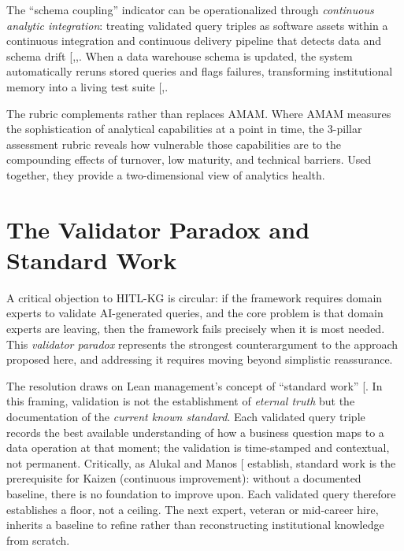 \documentclass[
  american,
  11pt,
  letterpaper,
  oneside  ,captions=tableheading
]{scrartcl}
\begin{document}
The ``schema coupling'' indicator can be operationalized through
\emph{continuous analytic integration}: treating validated query triples
as software assets within a continuous integration and continuous
delivery pipeline that detects data and schema drift
{[},,\citeproc{ref-mannapur2025}{68}{]}.
When a data warehouse schema is updated, the system automatically reruns
stored queries and flags failures, transforming institutional memory
into a living test suite
{[},\citeproc{ref-kottam2025}{70}{]}.

The rubric complements rather than replaces AMAM. Where AMAM measures
the sophistication of analytical capabilities at a point in time, the
3-pillar assessment rubric reveals how vulnerable those capabilities are
to the compounding effects of turnover, low maturity, and technical
barriers. Used together, they provide a two-dimensional view of
analytics health.

\section{The Validator Paradox and Standard
Work}\label{the-validator-paradox-and-standard-work}

A critical objection to HITL-KG is circular: if the framework requires
domain experts to validate AI-generated queries, and the core problem is
that domain experts are leaving, then the framework fails precisely when
it is most needed. This \emph{validator paradox} represents the
strongest counterargument to the approach proposed here, and addressing
it requires moving beyond simplistic reassurance.

The resolution draws on Lean management's concept of ``standard work''
{[}\citeproc{ref-alukal2006}{71}{]}. In this framing, validation is not
the establishment of \emph{eternal truth} but the documentation of the
\emph{current known standard}. Each validated query triple records the
best available understanding of how a business question maps to a data
operation at that moment; the validation is time-stamped and contextual,
not permanent. Critically, as Alukal and Manos
{[}\citeproc{ref-alukal2006}{71}{]} establish, standard work is the
prerequisite for Kaizen (continuous improvement): without a documented
baseline, there is no foundation to improve upon. Each validated query
therefore establishes a floor, not a ceiling. The next expert, veteran
or mid-career hire, inherits a baseline to refine rather than
reconstructing institutional knowledge from scratch.
\end{document}
